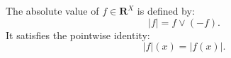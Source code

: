 The absolute value of $f \in \mathbf{R}^X$ is defined by:
$$|f| = f \vee (-f).$$
It satisfies the pointwise identity:
$$|f|(x) = |f(x)|.$$
